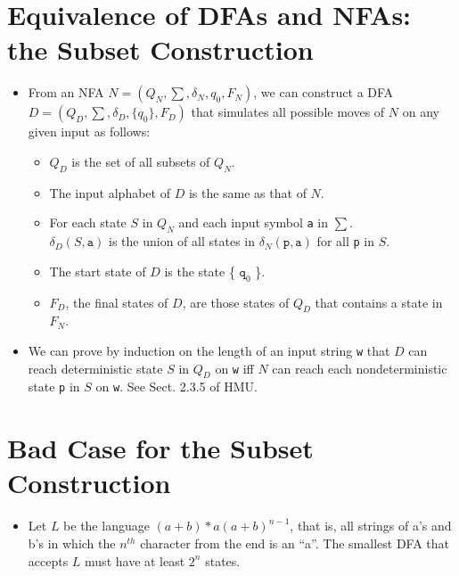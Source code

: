 \documentclass[]{article}
\begin{document}
\section{Equivalence of DFAs and NFAs: the Subset Construction}
  \begin{itemize}
    \item From an NFA $N = (Q_N, \sum, \delta_N, q_0, F_N)$, we can construct a 
    DFA $D = (Q_D, \sum, \delta_D, \{q_0\}, F_D)$ that simulates all possible 
    moves of $N$ on any given input as follows:
      \begin{itemize}
        \item $Q_D$ is the set of all subsets of $Q_N$.
        \item The input alphabet of $D$ is the same as that of $N$.
        \item For each state $S$ in $Q_N$ and each input symbol \texttt{a} in 
        $\sum$. \\
        $\delta_D(S, \texttt{a})$ is the union of all states in $\delta_N(
        \texttt{p}, \texttt{a})$ for all \texttt{p} in $S$. 
        \item The start state of $D$ is the state \{ $\texttt{q}_0$ \}.
        \item $F_D$, the final states of $D$, are those states of $Q_D$ that 
        contains a state in $F_N$.
      \end{itemize}
    \item We can prove by induction on the length of an input string \texttt{w} 
    that $D$ can reach deterministic state $S$ in $Q_D$ on \texttt{w} iff $N$ 
    can reach each nondeterministic state \texttt{p} in $S$ on \texttt{w}. See 
    Sect. 2.3.5 of HMU.
  \end{itemize}
  
\section{Bad Case for the Subset Construction}
  \begin{itemize}
    \item Let $L$ be the language $(a + b)*a(a+b)^{n-1}$, that is, all strings 
    of a's and b's in which the $n^{th}$ character from the end is an ``a''. The 
    smallest DFA that accepts $L$ must have at least $2^n$ states.
  \end{itemize}
  
\end{document}
